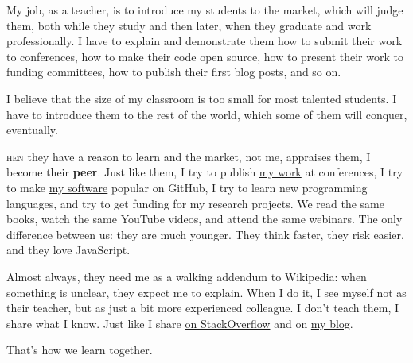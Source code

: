 \documentclass{./yb}
\newcommand\first[2]{\vspace{1em}{\setlength{\parindent}{0pt}\bfseries\LARGE #1}\textsc{#2}}
\begin{document}
My job, as a teacher, is to introduce my students to the market, which will
judge them, both while they study and then later, when they graduate and work
professionally. I have to explain and
demonstrate them how to submit their work to conferences, how to make
their code open source, how to present their work to funding committees,
how to publish their first blog posts, and so on.

I believe that the size of my classroom is too small for most talented students.
I have to introduce them to the rest of the world, which some of them will conquer, eventually.

\first{W}{hen} they have a reason to learn and the market, not me, appraises
them, I become their \textbf{peer}. Just like them, I try to publish
\href{https://www.yegor256.com/papers.html}{my work} at conferences,
I try to make \href{https://github.com/yegor256}{my software}
popular on GitHub, I try to learn new programming
languages, and try to get funding for my research projects.
We read the same books, watch the same YouTube videos, and attend the same webinars.
The only difference between us: they are much younger. They
think faster, they risk easier, and they love JavaScript.

Almost always, they need me as a walking addendum to Wikipedia:
when something is unclear, they expect me to explain. When I do it,
I see myself not as their teacher, but as just a bit more experienced colleague.
I don't teach them, I share what I know. Just like I share
\href{http://stackoverflow.com/users/187141/yegor256}{on StackOverflow}
and on \href{https://www.yegor256.com}{my blog}.

That's how we learn together.
\end{document}
